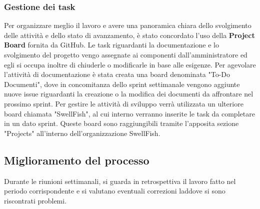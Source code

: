 \documentclass[12pt]{article}
\begin{document}
\subsubsection{Gestione dei task}
Per organizzare meglio il lavoro e avere una panoramica chiara dello svolgimento delle attività e dello stato di avanzamento, è stato concordato l'uso della \textbf{Project Board} fornita da GitHub.
Le task riguardanti la documentazione e lo svolgimento del progetto vengo assegnate ai componenti dall'amministratore ed egli si occupa inoltre di chiuderle o modificarle in base alle esigenze.
Per agevolare l'attività di documentazione è stata creata una board denominata "To-Do Documenti", dove in concomitanza dello sprint settimanale vengono aggiunte nuove issue riguardanti la creazione o la modifica dei documenti da affrontare nel prossimo sprint.
Per gestire le attività di sviluppo verrà utilizzata un ulteriore board chiamata "SwellFish", al cui interno verranno inserite le task da completare in un dato sprint.
Queste board sono raggiungibili tramite l'apposita sezione "Projects" all'interno dell'organizzazione SwellFish.


\subsection{Miglioramento del processo}
Durante le riunioni settimanali, si guarda in retrospettiva il lavoro fatto nel periodo corrispondente e si valutano eventuali correzioni laddove si sono riscontrati problemi.
\end{document}
